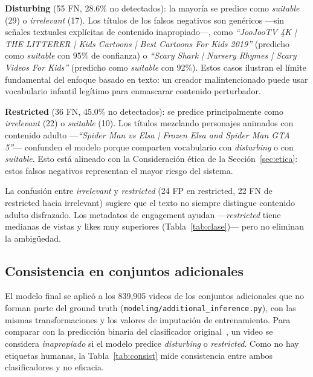 \documentclass[conference]{IEEEtran}
\begin{document}
\textbf{Disturbing} (55 FN, 28.6\% no detectados): la mayoría se predice como \textit{suitable} (29) o \textit{irrelevant} (17). Los títulos de los falsos negativos son genéricos —sin señales textuales explícitas de contenido inapropiado—, como \emph{``JooJooTV 4K | THE LITTERER | Kids Cartoons | Best Cartoons For Kids 2019''} (predicho como \textit{suitable} con 95\% de confianza) o \emph{``Scary Shark | Nursery Rhymes | Scary Videos For Kids''} (predicho como \textit{suitable} con 92\%). Estos casos ilustran el límite fundamental del enfoque basado en texto: un creador malintencionado puede usar vocabulario infantil legítimo para enmascarar contenido perturbador.

\textbf{Restricted} (36 FN, 45.0\% no detectados): se predice principalmente como \textit{irrelevant} (22) o \textit{suitable} (10). Los títulos mezclando personajes animados con contenido adulto —\emph{``Spider Man vs Elsa | Frozen Elsa and Spider Man GTA 5''}— confunden el modelo porque comparten vocabulario con \textit{disturbing} o con \textit{suitable}. Esto está alineado con la Consideración ética de la Sección~\ref{sec:etica}: estos falsos negativos representan el mayor riesgo del sistema.

La confusión entre \textit{irrelevant} y \textit{restricted} (24 FP en restricted, 22 FN de restricted hacia irrelevant) sugiere que el texto no siempre distingue contenido adulto disfrazado. Los metadatos de engagement ayudan —\textit{restricted} tiene medianas de vistas y likes muy superiores (Tabla~\ref{tab:clase})— pero no eliminan la ambigüedad.

\subsection{Consistencia en conjuntos adicionales}\label{sec:consistencia}
El modelo final se aplicó a los 839,905 videos de los conjuntos adicionales que no forman parte del ground truth (\texttt{modeling/additional\_inference.py}), con las mismas transformaciones y los valores de imputación de entrenamiento. Para comparar con la predicción binaria del clasificador original~\cite{papadamou}, un video se considera \textit{inapropiado} si el modelo predice \textit{disturbing} o \textit{restricted}. Como no hay etiquetas humanas, la Tabla~\ref{tab:consist} mide consistencia entre ambos clasificadores y no eficacia.
\end{document}
